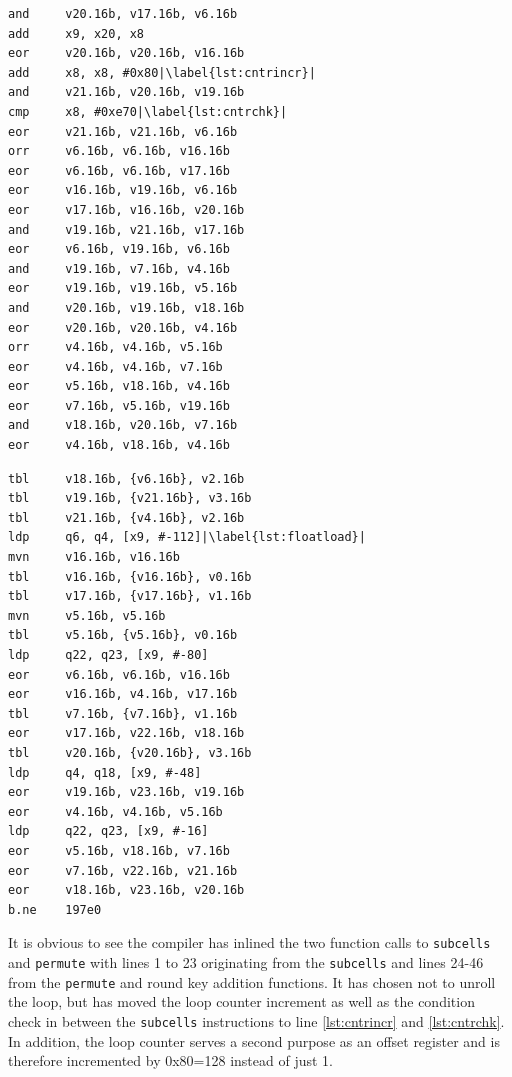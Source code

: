 \begin{minipage}{.45\textwidth}
    \begin{lstlisting}[language={[ARM]Assembler}, caption={\small Round function assembly}, escapechar=|]
and     v20.16b, v17.16b, v6.16b
add     x9, x20, x8
eor     v20.16b, v20.16b, v16.16b
add     x8, x8, #0x80|\label{lst:cntrincr}|
and     v21.16b, v20.16b, v19.16b
cmp     x8, #0xe70|\label{lst:cntrchk}|
eor     v21.16b, v21.16b, v6.16b
orr     v6.16b, v6.16b, v16.16b
eor     v6.16b, v6.16b, v17.16b
eor     v16.16b, v19.16b, v6.16b
eor     v17.16b, v16.16b, v20.16b
and     v19.16b, v21.16b, v17.16b
eor     v6.16b, v19.16b, v6.16b
and     v19.16b, v7.16b, v4.16b
eor     v19.16b, v19.16b, v5.16b
and     v20.16b, v19.16b, v18.16b
eor     v20.16b, v20.16b, v4.16b
orr     v4.16b, v4.16b, v5.16b
eor     v4.16b, v4.16b, v7.16b
eor     v5.16b, v18.16b, v4.16b
eor     v7.16b, v5.16b, v19.16b
and     v18.16b, v20.16b, v7.16b
eor     v4.16b, v18.16b, v4.16b
    \end{lstlisting}
\end{minipage}\hfill
\begin{minipage}{.45\textwidth}
    \vspace*{7mm}
    \begin{lstlisting}[language={[ARM]Assembler}, firstnumber=24, escapechar=|]
tbl     v18.16b, {v6.16b}, v2.16b
tbl     v19.16b, {v21.16b}, v3.16b
tbl     v21.16b, {v4.16b}, v2.16b
ldp     q6, q4, [x9, #-112]|\label{lst:floatload}|
mvn     v16.16b, v16.16b
tbl     v16.16b, {v16.16b}, v0.16b
tbl     v17.16b, {v17.16b}, v1.16b
mvn     v5.16b, v5.16b
tbl     v5.16b, {v5.16b}, v0.16b
ldp     q22, q23, [x9, #-80]
eor     v6.16b, v6.16b, v16.16b
eor     v16.16b, v4.16b, v17.16b
tbl     v7.16b, {v7.16b}, v1.16b
eor     v17.16b, v22.16b, v18.16b
tbl     v20.16b, {v20.16b}, v3.16b
ldp     q4, q18, [x9, #-48]
eor     v19.16b, v23.16b, v19.16b
eor     v4.16b, v4.16b, v5.16b
ldp     q22, q23, [x9, #-16]
eor     v5.16b, v18.16b, v7.16b
eor     v7.16b, v22.16b, v21.16b
eor     v18.16b, v23.16b, v20.16b
b.ne    197e0
    \end{lstlisting}
\end{minipage}

It is obvious to see the compiler has inlined the two function calls to
\texttt{subcells} and \texttt{permute} with lines 1 to 23 originating from the
\texttt{subcells} and lines 24-46 from the \texttt{permute} and round key
addition functions. It has chosen not to unroll the loop, but has moved the
loop counter increment as well as the condition check in between the
\texttt{subcells} instructions to line \ref{lst:cntrincr} and
\ref{lst:cntrchk}. In addition, the loop counter serves a second purpose as an
offset register and is therefore incremented by 0x80=128 instead of just 1.

